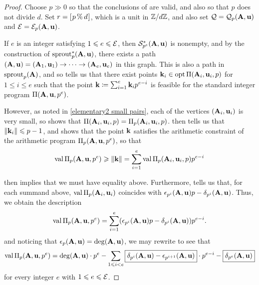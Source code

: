\documentclass{amsart}
\begin{document}

\begin{proof}
   Choose $p \gg 0$ so that the conclusions of  are valid, and also so that $p$ does not divide $d$.  Set $r = [ \hspace{.01in} p \, \% \, d \hspace{.01in} ]$, which is a unit in $\mathbb{Z}/d\mathbb{Z}$, and also set $\mathcal{Q} = \mathcal{Q}_p(\mathbf{A},\mathbf{u})$ and $\mathcal{E} = \mathcal{E}_p(\mathbf{A}, \mathbf{u})$.  
   
   If $e$ is an integer satisfying $1 \leqslant e \leqslant \mathcal{E}$, then $\mathcal{S}_{p^e}^{\ast}(\mathbf{A},\mathbf{u})$ is nonempty, and by the construction of $\operatorname{sprout}_p^{\ast}(\mathbf{A},\mathbf{u})$, there exists a path $(\mathbf{A},\mathbf{u}) = (\mathbf{A}_1, \mathbf{u}_1) \to \cdots \to (\mathbf{A}_e, \mathbf{u}_e)$ in this graph.
   This is also a path in $\operatorname{sprout}_p(\mathbf{A})$, and so  tells us that there exist points $\mathbf{k}_i \in \operatorname{opt} \Pi(\mathbf{A}_i, \mathbf{u}_i, p)$ for $1 \le i \le e$ such that the point $\mathbf{k} \coloneqq \sum_{i=1}^e \mathbf{k}_i p^{e-i}$ is feasible for the standard integer program $\Pi(\mathbf{A}, \mathbf{u}, p^e)$.

   However, as noted in \eqref{elementary2 small pairs}, each of the vertices $(\mathbf{A}_i, \mathbf{u}_i)$ is very small, so  shows that $\Pi(\mathbf{A}_i,\mathbf{u}_i,p) = \Pi_p(\mathbf{A}_i, \mathbf{u}_i, p)$.
    then tells us that $\| \mathbf{k}_i \| \leqslant p - 1$, and  shows that the point $\mathbf{k}$ satisfies the arithmetic constraint of the arithmetic program $\Pi_p(\mathbf{A},\mathbf{u},p^e)$, so that
   \[
	\operatorname{val} \Pi_p(\mathbf{A},\mathbf{u},p^e) \geqslant  \| \mathbf{k} \| = \sum_{i=1}^e \operatorname{val} \Pi_p(\mathbf{A}_i,\mathbf{u}_i,p) p^{e-i}
	\]
   
    then implies that we must have equality above.  Furthermore,  tells us that, for each summand above,  $\operatorname{val} \Pi_p(\mathbf{A}_i, \mathbf{u}_i)$ coincides with $\epsilon_{p^i}(\mathbf{A},\mathbf{u})p - \delta_{p^i}(\mathbf{A},\mathbf{u})$.  Thus, we obtain the description
   \begin{equation}
   \label{value-for-e-at-most-curly-E: q}
     \operatorname{val} \Pi_p(\mathbf{A},\mathbf{u},p^e) = \sum_{i=1}^e (\epsilon_{p^i}(\mathbf{A},\mathbf{u})p - \delta_{p^i}(\mathbf{A},\mathbf{u})) p^{e-i}.
   \end{equation}
 and noticing that $\epsilon_p(\mathbf{A},\mathbf{u}) = \operatorname{deg}(\mathbf{A},\mathbf{u})$, we may rewrite to see that
\[
     \operatorname{val} \Pi_p(\mathbf{A},\mathbf{u},p^e) = \operatorname{deg}(\mathbf{A}, \mathbf{u}) \cdot p^e - \sum_{1 \leqslant i < e} \boxed{\delta_{p^i}(\mathbf{A}, \mathbf{u}) - \epsilon_{p^{i+1}}(\mathbf{A}, \mathbf{u})} \cdot p^{e-i} - \boxed{\delta_{p^e}(\mathbf{A}, \mathbf{u})}
\]
   for every integer $e$ with $1 \leqslant e \leqslant \mathcal{E}$.  
   

\end{proof}
\end{document}
